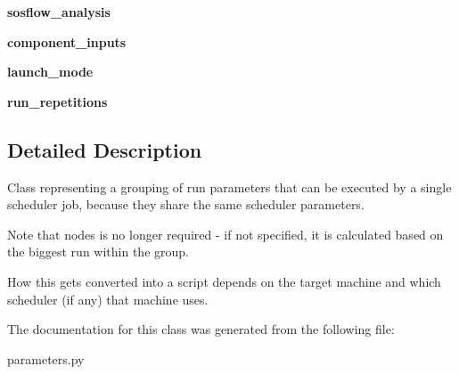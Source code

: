 \begin{DoxyCompactItemize}
{\bfseries sosflow\+\_\+analysis}
\item 
\mbox{\label{classcodar_1_1cheetah_1_1parameters_1_1_sweep_group_a4085f622e238b237b685ca82cf57ff0e}} 
{\bfseries component\+\_\+inputs}
\item 
\mbox{\label{classcodar_1_1cheetah_1_1parameters_1_1_sweep_group_aab0922af464666db293542868a254191}} 
{\bfseries launch\+\_\+mode}
\item 
\mbox{\label{classcodar_1_1cheetah_1_1parameters_1_1_sweep_group_af2263721c5031a2a4dd85ae039f670d4}} 
{\bfseries run\+\_\+repetitions}
\end{DoxyCompactItemize}


\subsection{Detailed Description}
\begin{DoxyVerb}Class representing a grouping of run parameters that can be executed by
a single scheduler job, because they share the same scheduler parameters.

Note that nodes is no longer required - if not specified, it is calculated
based on the biggest run within the group.

How this gets converted into a script depends on the target machine and
which scheduler (if any) that machine uses.
\end{DoxyVerb}
 

The documentation for this class was generated from the following file\+:\begin{DoxyCompactItemize}
\item 
parameters.\+py\end{DoxyCompactItemize}
